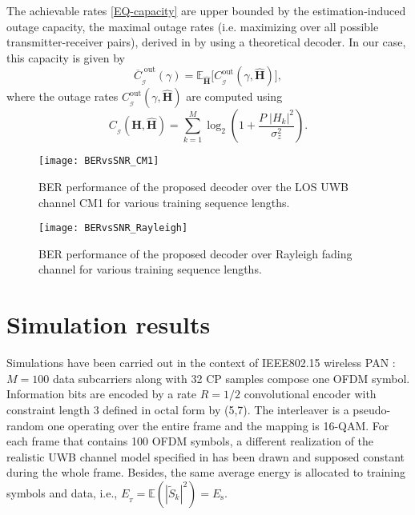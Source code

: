 \documentclass{article}
\begin{document}
The achievable rates \eqref{EQ-capacity} are upper bounded by the estimation-induced outage capacity, the maximal outage rates (i.e. maximizing over all possible transmitter-receiver pairs), derived in \cite{piantanida} by using a theoretical decoder. In our case, this capacity is given by
\begin{equation}
\overline{C}_{_\mathcal{G}}^{\; \mathrm{out}}(\gamma)=\mathbb{E}_{\widehat{\mathbf{H}}}\big[C_{_\mathcal{G}}^{\mathrm{out}}(\gamma,\widehat{\mathbf{H}})\big], \label{perfect-capacity}
\end{equation}
where the outage rates $C_{_\mathcal{G}}^{\mathrm{out}}(\gamma,\widehat{\mathbf{H}})$ are computed using 
\begin{equation}
C_{_\mathcal{G}}(\mathbf{H},\widehat{\mathbf{H}})=\sum\limits_{k=1}^{M} \log_2\left(1+\frac{P\;|H _k|^2}{\sigma^2_z}\right). 
\end{equation}

\begin{figure}[!htb] 
\centering
\texttt{[image: BERvsSNR\_CM1]} 
\caption{BER performance of the proposed decoder over the LOS UWB channel CM1 for various training sequence lengths.}\label{fig3}
\end{figure} 

\begin{figure}[!htb] 
\centering
\texttt{[image: BERvsSNR\_Rayleigh]} 
\caption{BER performance of the proposed decoder over Rayleigh fading channel for various training sequence lengths.}\label{fig4}
\end{figure} 
\section{Simulation results}
\label{sec:simul}
Simulations have been carried out in the context of IEEE802.15 wireless PAN \cite{norme_mb}: $M=100$ data subcarriers along with 32 CP samples compose one OFDM symbol. Information bits are encoded by a rate $R=1/2$ convolutional encoder with constraint length 3 defined in octal form by (5,7). The interleaver is a pseudo-random one operating over the entire frame and the mapping is 16-QAM. 
For each frame that contains 100 OFDM symbols, a different realization of the realistic UWB channel model specified in \cite{chanReport} has been drawn and supposed constant during the whole frame. Besides, the same average energy is allocated to training symbols and data, i.e., $E_{_T}=\mathbb{E}(|\tilde{S}_k|^2)=E_\mathrm{s}$. 
\end{document}
